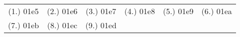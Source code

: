 \begin{eocexercises}{}
\begin{enumerate}

\end{enumerate}






\par \practiceinfo
\par \begin{tabular}[h]{cccccc}
(1.)	01e5	&
(2.)	01e6	&
(3.)	01e7	&
(4.)	01e8	&
(5.)	01e9	&
(6.)	01ea	\\ %
(7.)	01eb	&
(8.)	01ec	&
(9.)	01ed	&

\end{tabular}
\end{eocexercises}
